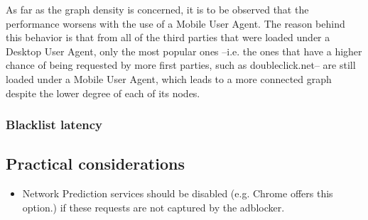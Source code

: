 \documentclass{sig-alternate}
\begin{document}
{As far as the graph density is concerned, it is to be observed that the performance worsens with the use of a Mobile User Agent. The reason behind this behavior is that from all of the third parties that were loaded under a Desktop User Agent, only the most popular ones --i.e. the ones that have a higher chance of being requested by more first parties, such as doubleclick.net-- are still loaded under a Mobile User Agent, which leads to a more connected graph despite the lower degree of each of its nodes.
}

\subsubsection{Blacklist latency}

\subsection{Practical considerations}
\begin{itemize}
\item Network Prediction services should be disabled (e.g. Chrome offers this option.) if these requests are not captured by the adblocker.
\end{itemize}
\end{document}
